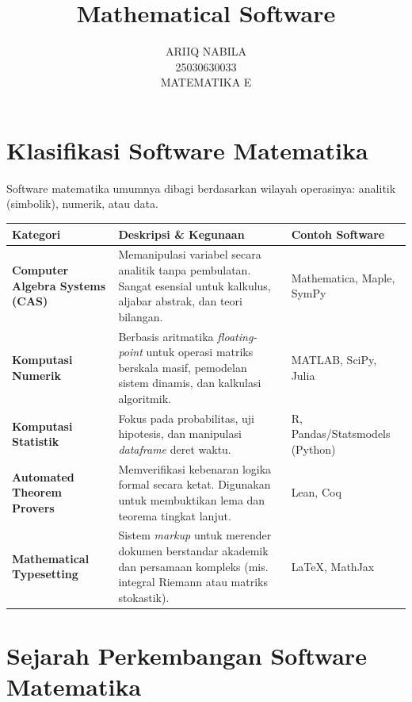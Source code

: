 \documentclass[11pt, a4paper, numbers=enddot, oneside]{scrbook}
\title{Mathematical Software}
\author{ARIIQ NABILA \\ 25030630033 \\ MATEMATIKA E}
\date{}
\begin{document}
\frontmatter
\maketitle
\tableofcontents

\mainmatter

\chapter{Klasifikasi Software Matematika}

Software matematika umumnya dibagi berdasarkan wilayah operasinya: analitik (simbolik), numerik, atau data.

\begin{table}[htbp]
\centering
\renewcommand{\arraystretch}{1.35}
\begin{tabularx}{\textwidth}{>{\raggedright\arraybackslash}p{4.3cm} >{\raggedright\arraybackslash}X >{\raggedright\arraybackslash}p{3.6cm}}
\toprule
\textbf{Kategori} & \textbf{Deskripsi \& Kegunaan} & \textbf{Contoh Software} \\
\midrule
\textbf{Computer Algebra Systems (CAS)} & Memanipulasi variabel secara analitik tanpa pembulatan. Sangat esensial untuk kalkulus, aljabar abstrak, dan teori bilangan. & Mathematica, Maple, SymPy \\
\midrule
\textbf{Komputasi Numerik} & Berbasis aritmatika \emph{floating-point} untuk operasi matriks berskala masif, pemodelan sistem dinamis, dan kalkulasi algoritmik. & MATLAB, SciPy, Julia \\
\midrule
\textbf{Komputasi Statistik} & Fokus pada probabilitas, uji hipotesis, dan manipulasi \emph{dataframe} deret waktu. & R, Pandas/Statsmodels (Python) \\
\midrule
\textbf{Automated Theorem Provers} & Memverifikasi kebenaran logika formal secara ketat. Digunakan untuk membuktikan lema dan teorema tingkat lanjut. & Lean, Coq \\
\midrule
\textbf{Mathematical Typesetting} & Sistem \emph{markup} untuk merender dokumen berstandar akademik dan persamaan kompleks (mis. integral Riemann atau matriks stokastik). & LaTeX, MathJax \\
\bottomrule
\end{tabularx}
\end{table}

\chapter{Sejarah Perkembangan Software Matematika}
\end{document}
